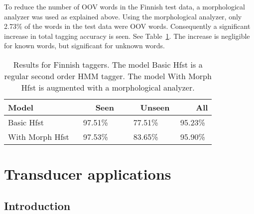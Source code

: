 \documentclass{llncs}
\begin{document}
To reduce the number of OOV words in the Finnish test data, a
morphological analyzer was used as explained above. Using the
morphological analyzer, only 2.73\% of the words in the test data
were OOV words. Consequently a significant increase in total tagging
accuracy is seen. See Table~\ref{fin-tagging-acc}. The increase is
negligible for known words, but significant for unknown words.

\begin{table}
  \caption{Results for Finnish taggers. The model Basic Hfst is a
    regular second order HMM tagger. The model With Morph Hfst is
    augmented with a morphological analyzer.}\label{fin-tagging-acc}
  \begin{center}
    \begin{tabular}{lccc}
      \hline 
      Model            & ~~~~Seen & ~~~~Unseen & ~~~~All \\
      \hline 
      Basic Hfst       &  97.51\% &    77.51\% & 95.23\% \\
      With Morph Hfst  &  97.53\% &    83.65\% & 95.90\% \\
      \hline
    \end{tabular}
  \end{center}
\end{table}


\section{Transducer applications}\label{Applications}

\subsection{Introduction}
\end{document}
